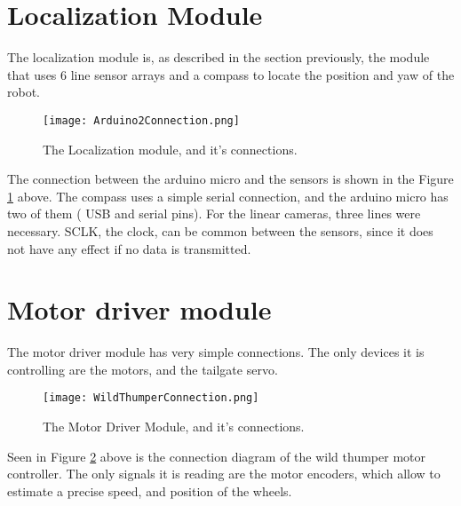 \section{Localization Module}

The localization module is, as described in the section previously, the module that uses 6 line sensor arrays and a compass to locate the position and yaw of the robot. 

\begin{figure}[H]
  \centering
  \texttt{[image: Arduino2Connection.png]}
  \caption{The Localization module, and it's connections.}
\label{fig:ard2connection}
\end{figure}

The connection between the arduino micro and the sensors is shown in the Figure \ref{fig:ard2connection} above. The compass uses a simple serial connection, and the arduino micro has two of them ( USB and serial pins). For the linear cameras, three lines were necessary. SCLK, the clock, can be common between the sensors, since it does not have any effect if no data is transmitted. %

\section{Motor driver module}

The motor driver module has very simple connections. The only devices it is controlling are the motors, and the tailgate servo.

\begin{figure}[H]
  \centering
  \texttt{[image: WildThumperConnection.png]}
  \caption{The Motor Driver Module, and it's connections.}
\label{fig:wtconnection}
\end{figure}

Seen in Figure \ref{fig:wtconnection} above is the connection diagram of the wild thumper motor controller. The only signals it is reading are the motor encoders, which allow to estimate a precise speed, and position of the wheels.


